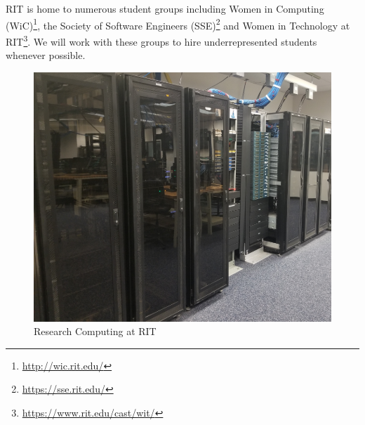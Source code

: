 \documentclass[11pt]{article}
\begin{document}
RIT is home to numerous student groups including Women in Computing (WiC)\footnote{\url{http://wic.rit.edu/}}, the Society of Software Engineers (SSE)\footnote{\url{https://sse.rit.edu/}} and Women in Technology at RIT\footnote{\url{https://www.rit.edu/cast/wit/}}. We will work with these groups to hire underrepresented students whenever possible.





\begin{figure}[h]
 	\centering
 	\includegraphics[scale=0.30]{images/CompLab2_sm.png}
   	\caption{Research Computing at RIT}
   	\label{fig:RITResearchComputing}
\end{figure}






\end{document}
